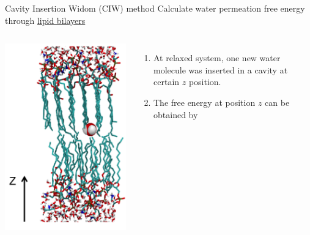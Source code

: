 \documentclass{beamer}
\begin{document}
\begin{frame}[label=CIW]{Cavity Insertion Widom (CIW) method} 
Calculate water permeation free energy through \hyperlink{CIWR}{lipid bilayers}
\begin{columns}
	\includegraphics[width=\linewidth]{Pics/CIW.png}
	\begin{enumerate}
		\item At relaxed system, one new water molecule was inserted in a cavity at certain $z$ position. 
		\item The free energy at position $z$ can be obtained by 

\end{enumerate}
\end{columns}
\end{frame}
\end{document}
